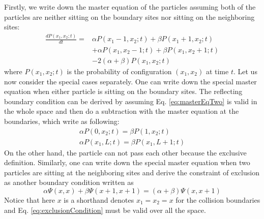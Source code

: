 \documentclass[aps,showpacs,twocolumn,floatfix,prx,superscriptaddress]{revtex4-1}
\begin{document}
Firstly, we write down the master equation of the particles assuming both of the particles are neither sitting on the boundary sites nor sitting on the neighboring sites:
\begin{equation}
    \begin{aligned}
    \label{eq:masterEqTwo}
    \frac{d P(x_1, x_2; t)}{dt} = & \alpha P(x_1-1,x_2;t) + \beta P(x_1+1,x_2;t) \\ 
    & + \alpha P(x_1, x_2-1; t) + \beta P(x_1, x_2+1; t)  \\ 
    & - 2(\alpha+\beta)P(x_1, x_2; t)
    \end{aligned}
\end{equation}
where $P(x_1, x_2; t)$ is the probability of configuration $(x_1, x_2)$ at time $t$. Let us now consider the special cases separately. One can write down the special master equation when either particle is sitting on the boundary sites.  The reflecting boundary condition can be derived by assuming Eq.  \eqref{eq:masterEqTwo} is valid in the whole space and then do a subtraction with the master equation at the boundaries, which write as following:
\begin{subequations}
    \label{eq:boundaries-two-particles}
    \begin{eqnarray}
        \alpha P(0,x_2;t) = \beta P(1, x_2;t) \\
        \alpha P(x_1, L;t) = \beta P(x_1, L+1;t)
    \end{eqnarray}
\end{subequations}
On the other hand, the particle can not pass each other because the exclusive definition. Similarly, one can write down the special master equation when two particles are sitting at the neighboring sites and derive the constraint of exclusion as another boundary condition written as 
\begin{equation}
    \label{eq:exclusionCondition}
    \alpha \Psi(x, x) + \beta \Psi(x+1, x+1) = (\alpha + \beta) \Psi(x, x+1)
\end{equation}
Notice that here $x$ is a shorthand denotes $x_1=x_2=x$ for the collision boundaries and Eq. \eqref{eq:exclusionCondition} must be valid over all the space.
\end{document}
